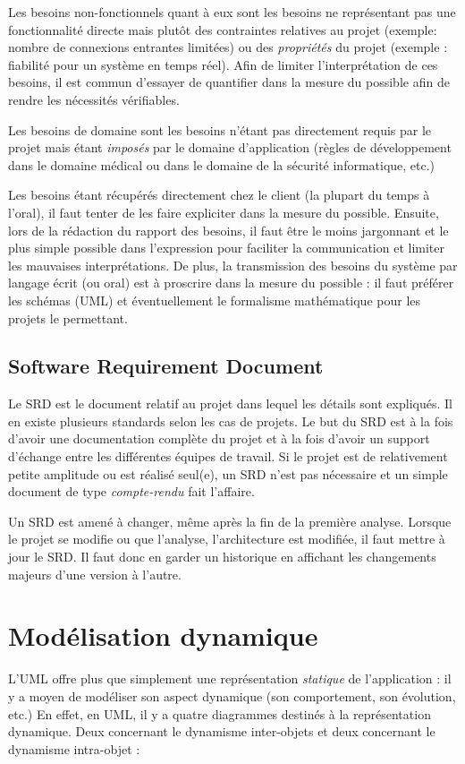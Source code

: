 \documentclass{article}
\begin{document}
	Les besoins non-fonctionnels quant à eux sont les besoins ne représentant pas une fonctionnalité directe mais plutôt des contraintes relatives au projet (exemple: nombre de connexions
	entrantes limitées) ou des \textit{propriétés} du projet (exemple : fiabilité pour un système en temps réel). Afin de limiter l'interprétation de ces besoins, il est commun d'essayer de
	quantifier dans la mesure du possible afin de rendre les nécessités vérifiables.

	Les besoins de domaine sont les besoins n'étant pas directement requis par le projet mais étant \textit{imposés} par le domaine d'application (règles de développement dans le domaine médical
	ou dans le domaine de la sécurité informatique, etc.)

	Les besoins étant récupérés directement chez le client (la plupart du temps à l'oral), il faut tenter de les faire expliciter dans la mesure du possible. Ensuite, lors de la rédaction
	du rapport des besoins, il faut être le moins jargonnant et le plus simple possible dans l'expression pour faciliter la communication et limiter les mauvaises interprétations.
	De plus, la transmission des besoins du système par langage écrit (ou oral) est à proscrire dans la mesure du possible : il faut préférer les schémas (UML) et éventuellement le formalisme
	mathématique pour les projets le permettant.

	\subsection{Software Requirement Document}
		Le SRD est le document relatif au projet dans lequel les détails sont expliqués. Il en existe plusieurs standards selon les cas de projets. Le but du SRD est à la fois d'avoir une
		documentation complète du projet et à la fois d'avoir un support d'échange entre les différentes équipes de travail. Si le projet est de relativement petite amplitude ou est réalisé seul(e),
		un SRD n'est pas nécessaire et un simple document de type \textit{compte-rendu} fait l'affaire.

		Un SRD est amené à changer, même après la fin de la première analyse. Lorsque le projet se modifie ou que l'analyse, l'architecture est modifiée, il faut mettre à jour le SRD. Il faut
		donc en garder un historique en affichant les changements majeurs d'une version à l'autre.

\section{Modélisation dynamique}
	L'UML offre plus que simplement une représentation \textit{statique} de l'application : il y a moyen de modéliser son aspect dynamique (son comportement, son évolution, etc.)
	En effet, en UML, il y a quatre diagrammes destinés à la représentation dynamique. Deux concernant le dynamisme inter-objets et deux concernant le dynamisme intra-objet :
\end{document}
